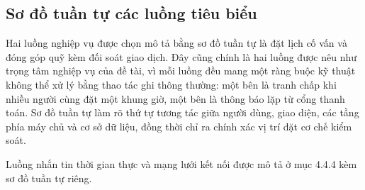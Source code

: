 \documentclass[12pt,a4paper,oneside]{report}
\begin{document}
\subsection{Sơ đồ tuần tự các luồng tiêu biểu}

Hai luồng nghiệp vụ được chọn mô tả bằng sơ đồ tuần tự là đặt lịch cố vấn và đóng góp quỹ kèm đối soát giao dịch. Đây cũng chính là hai luồng được nêu như trọng tâm nghiệp vụ của đề tài, vì mỗi luồng đều mang một ràng buộc kỹ thuật không thể xử lý bằng thao tác ghi thông thường: một bên là tranh chấp khi nhiều người cùng đặt một khung giờ, một bên là thông báo lặp từ cổng thanh toán. Sơ đồ tuần tự làm rõ thứ tự tương tác giữa người dùng, giao diện, các tầng phía máy chủ và cơ sở dữ liệu, đồng thời chỉ ra chính xác vị trí đặt cơ chế kiểm soát.

Luồng nhắn tin thời gian thực và mạng lưới kết nối được mô tả ở mục 4.4.4 kèm sơ đồ tuần tự riêng.
\end{document}
